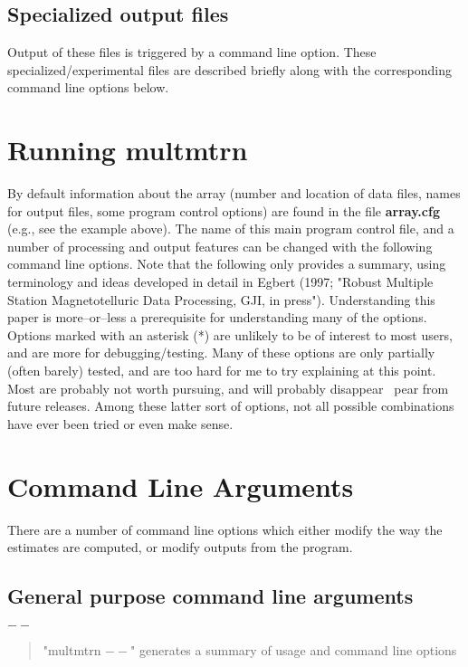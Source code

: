 \subsection{Specialized output files}

Output of these files is triggered by a command line option.  These
specialized/experimental files are described briefly along with the
corresponding command line options below.

\section{Running multmtrn}

\noindent

By default information about the array (number and location of data files,
names for output files, some program control options) are found in the
file {\bf array.cfg} (e.g., see the example above).  The name of 
this main program control file, and a number of processing
and output features can be changed with the following command line options.
Note that the following only provides a summary, using terminology and ideas
developed in detail in Egbert (1997; "Robust Multiple Station Magnetotelluric
Data Processing, GJI, in press").  Understanding this paper is more--or--less a prerequisite
for understanding many of the options.   Options marked with an asterisk (*)
are unlikely to be of interest to most users,
and are more for debugging/testing.
Many of these options are only partially (often barely) tested, and
are too hard for me to try explaining at this point.  Most are
probably not worth pursuing, and will probably disappearpear from future releases.
Among these latter sort of options, not all possible combinations
have ever been tried or even make sense. 


\section{Command Line Arguments}

There are a number of command line options which either modify
the way the estimates are computed, or modify outputs from the program.

\setlength{\parindent}{0em}

\subsection{General purpose command line arguments}

 $- -$
\begin{quote}
"multmtrn $- -$"  generates a summary of usage and command line options
\end{quote}

